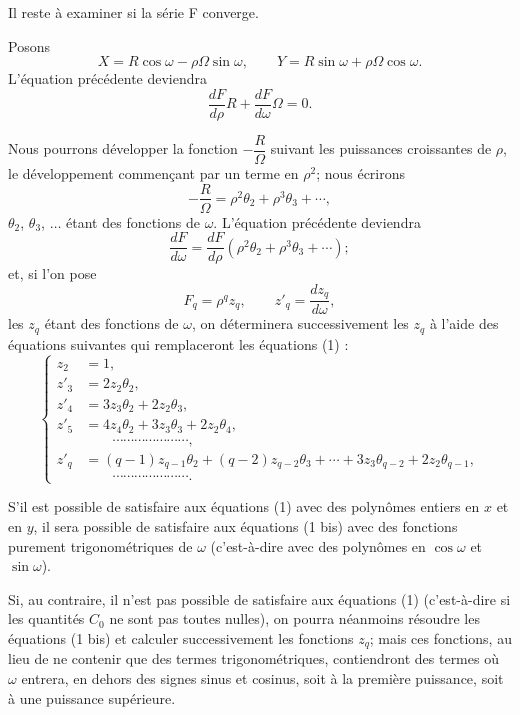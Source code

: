 \documentclass[11pt]{article}
\begin{document}
Il reste à examiner si la série F converge.

Posons
\[
X=R\cos\omega-\rho\Omega\sin\omega,
\qquad
Y=R\sin\omega+\rho\Omega\cos\omega.
\]
L’équation précédente deviendra
\[
\frac{dF}{d\rho}R+\frac{dF}{d\omega}\Omega=0.
\]

Nous pourrons développer la fonction $-\dfrac{R}{\Omega}$ suivant les puissances croissantes de $\rho$, le développement commençant par un terme en $\rho^2$; nous écrirons
\[
-\frac{R}{\Omega}=\rho^2\theta_2+\rho^3\theta_3+\cdots,
\]
$\theta_2$, $\theta_3$, $\ldots$ étant des fonctions de $\omega$. L’équation précédente deviendra
\[
\frac{dF}{d\omega}=\frac{dF}{d\rho}(\rho^2\theta_2+\rho^3\theta_3+\cdots);
\]
et, si l’on pose
\[
F_q=\rho^qz_q,
\qquad
z'_q=\frac{dz_q}{d\omega},
\]
les $z_q$ étant des fonctions de $\omega$, on déterminera successivement les $z_q$ à l’aide des équations suivantes qui remplaceront les équations (1) :
\begin{equation}\tag{1 bis}
\left\{
\begin{aligned}
z_2&=1,\\
z'_3&=2z_2\theta_2,\\
z'_4&=3z_3\theta_2+2z_2\theta_3,\\
z'_5&=4z_4\theta_2+3z_3\theta_3+2z_2\theta_4,\\
&\hspace{2em}\cdots\cdots\cdots\cdots\cdots\cdots\cdots,\\
z'_q&=(q-1)z_{q-1}\theta_2+(q-2)z_{q-2}\theta_3+\cdots+3z_3\theta_{q-2}+2z_2\theta_{q-1},\\
&\hspace{2em}\cdots\cdots\cdots\cdots\cdots\cdots\cdots.
\end{aligned}
\right.
\end{equation}

S’il est possible de satisfaire aux équations (1) avec des polynômes entiers en $x$ et en $y$, il sera possible de satisfaire aux équations (1 bis) avec des fonctions purement trigonométriques de $\omega$ (c’est-à-dire avec des polynômes en $\cos\omega$ et $\sin\omega$).

Si, au contraire, il n’est pas possible de satisfaire aux équations (1) (c’est-à-dire si les quantités $C_0$ ne sont pas toutes nulles), on pourra néanmoins résoudre les équations (1 bis) et calculer successivement les fonctions $z_q$; mais ces fonctions, au lieu de ne contenir que des termes trigonométriques, contiendront des termes où $\omega$ entrera, en dehors des signes sinus et cosinus, soit à la première puissance, soit à une puissance supérieure.
\end{document}
